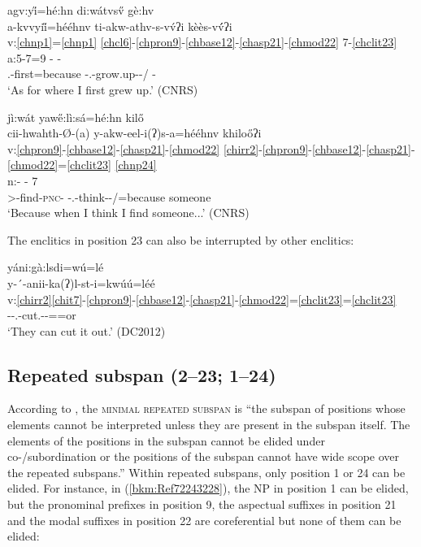 \documentclass[output=paper]{langscibook}
\begin{document}
\ea\label{bkm:Ref72236223}agv:y\H{i}=hé:hn di:wátvs\H{v} gè:hv \\
\gllll a-kvvyii̋=hééhnv ti-akw-athv-s-vv́ʔi kèès-vv́́ʔi\\
v:\ref{chnp1}=\ref{chnp1} \ref{chcl6}-\ref{chpron9}-\ref{chbase12}-\ref{chasp21}-\ref{chmod22} 7-\ref{chclit23}\\
a:5-7=9 - -\\ 
\Third\Sg.\Aarg{}-first=because \Cisl{}-\First\Sg.\Barg{}-grow.up-\Prf{}-\Asr/\Sh{} \Cop{}-\Asr{}\\
\glt `As for where I first grew up.' (CNRS) 
\z 

\ea\label{bkm:Ref72236233}jì:wát yaw\H{e}:lì:sá=hé:hn kil\H{o} \\
\gllll cii-hwahth-Ø-(a)  y-akw-eel-i(ʔ)s-a=hééhnv khilo\H{o}ʔi\\
v:\ref{chpron9}-\ref{chbase12}-\ref{chasp21}-\ref{chmod22} \ref{chirr2}-\ref{chpron9}-\ref{chbase12}-\ref{chasp21}-\ref{chmod22}=\ref{chclit23} \ref{chnp24}\\
n:- - 7\\ 
\First\Sg>\An{}-find-\textsc{pnc}-\Ind{} \Irr{}-\First\Sg.\Barg{}-think-\Prf{}-\Ind/\Sh{}=because someone\\ 
\glt `Because when I think I find someone...' (CNRS)
\z 

The enclitics in position 23 can also be interrupted by other enclitics:

\ea\label{ex:cher:key:74} {yáni:gà:lsdi=wú=lé} \\
\glll y-´-anii-ka(ʔ)l-st-i=kwúú=léé \\
v:\ref{chirr2}\ref{chit7}-\ref{chpron9}-\ref{chbase12}-\ref{chasp21}-\ref{chmod22}=\ref{chclit23}=\ref{chclit23}\\
\Irr{}-\Iter{}-\Third\Pl.\Aarg{}-cut.\Fl{}-\Inf{}-\Nom{}=\Dt{}=or \\
\glt `They can cut it out.' (DC2012)
\z 


\subsection{Repeated subspan (2--23; 1--24)}
\label{bkm:Ref87350432}
According to \citet[30]{Tallman2020}, the \textsc{minimal} \textsc{repeated} \textsc{subspan} is “the subspan of positions whose elements cannot be interpreted unless they are present in the subspan itself. The elements of the positions in the subspan cannot be elided under co-/subordination or the positions of the subspan cannot have wide scope over the repeated subspans.” Within repeated subspans, only position 1 or 24 can be elided. For instance, in (\ref{bkm:Ref72243228}), the NP in position 1 can be elided, but the pronominal prefixes in position 9, the aspectual suffixes in position 21 and the modal suffixes in position 22 are coreferential but none of them can be elided:
\end{document}
